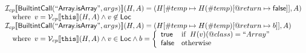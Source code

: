 \documentclass{article}
\makeatletter
\newcommand{\SF}[1]{\mbox{\textsf{#1}}}
\newcommand{\TT}[1]{\mbox{\texttt{#1}}}
\newcommand{\wherec}[1]{{\rm where}\begin{array}[t]{l}#1\end{array}}
\newcommand{\ifc}[1]{{\rm if}\begin{array}[t]{l}#1\end{array}}
\newcommand{\owc}{{\rm otherwise}}
\newcommand{\I}{\mathcal{I}}
\newcommand{\V}{\mathcal{V}}
\newcommand{\lbr}{\llbracket}
\newcommand{\rbr}{\rrbracket}
\newcommand{\varloc}[1]{\##1}
\newcommand{\varprop}[1]{@#1}
\makeatother
\begin{document}
\[\begin{array}{l}
\\\\


\I _{cp}\lbr \SF{BuiltintCall}(``\SF{Array.isArray}",args)\rbr(H,A)
 = (H[\varloc{temp}\mapsto H(\varloc{temp})[\varprop{return}\mapsto \SF{false}]], A) \\
\quad\wherec{
  v = \V _{cp}\lbr \TT{this}\rbr (H,A) \land v \not\in \SF{Loc} 
  }\\

\I _{cp}\lbr \SF{BuiltintCall}(``\SF{Array.isArray}",args)\rbr(H,A)
 = (H[\varloc{temp}\mapsto H(\varloc{temp})[\varprop{return}\mapsto b]], A) \\
\quad\wherec{
  v = \V _{cp}\lbr \TT{this}\rbr (H,A) \land v \in \SF{Loc}
  \land b = \left\{\begin{array}{ll}
      \SF{true} & \ifc{H(v)(@class) = ``Array"}\\
      \SF{false} & \owc
    \end{array}\right.
  }\\
\end{array}
\]
\end{document}
